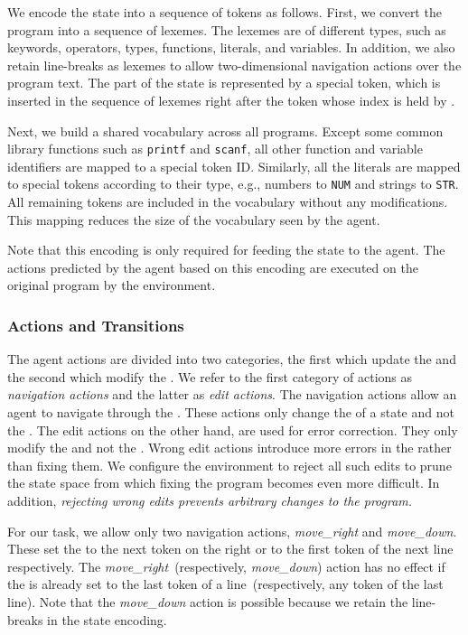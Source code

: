 \documentclass{article}
\begin{document}
We encode the state into a sequence of tokens as follows.
First, we convert the program  into a sequence of lexemes. 
The lexemes are of different types, such as keywords, operators, types, functions, literals, and variables.
In addition, we also retain line-breaks as lexemes to allow
two-dimensional navigation actions over the program text.
The  part of the state is represented by a special token, which is inserted in the sequence of lexemes right after the token whose index is held by .

Next, we build a shared vocabulary across all programs.
Except some common library functions such as \texttt{printf} and \texttt{scanf}, 
all other function and variable identifiers are mapped to a special token ID. 
Similarly, all the literals are mapped to special tokens according to their type, e.g., numbers to \texttt{NUM} and strings to \texttt{STR}.
All remaining tokens are included in the vocabulary without any modifications.
This mapping reduces the size of the vocabulary seen by the agent.

Note that this encoding is only required for feeding the state to the agent.
The actions predicted by the agent based on this encoding are executed on the original program  by the environment.
	
\subsubsection{Actions and Transitions}
The agent actions are divided into two categories, the first which update the  and the second which modify the .
We refer to the first category of actions as \emph{navigation actions} and the latter as \emph{edit actions}. 
The navigation actions allow an agent to navigate through the . These actions only change the  of a state and not the .
The edit actions on the other hand, are used for error correction.
They only modify the  and not the .
Wrong edit actions introduce more errors in the  rather than fixing them.
We configure the environment to reject all such edits to prune the state space from which fixing the program becomes even more difficult.
In addition, \emph{rejecting wrong edits prevents arbitrary changes to the program.}

For our task, we allow only two navigation actions, \emph{move\_right} and \emph{move\_down}.
These set the  to the next token on the right or to the first token of the next line respectively.
The \emph{move\_right}~(respectively, \emph{move\_down}) action has no effect if the  is already set to the last token of a line~(respectively, any token of the last line).
Note that the \emph{move\_down} action is possible because we retain the line-breaks in the state encoding.
\end{document}
